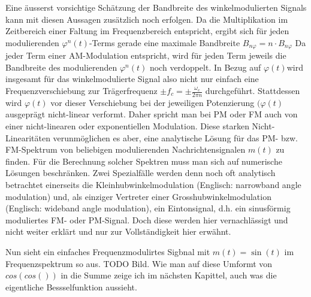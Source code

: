 Eine äusserst vorsichtige Schätzung der Bandbreite des winkelmodulierten Signals kann mit diesen Aussagen zusätzlich noch erfolgen.
Da die Multiplikation im Zeitbereich einer Faltung im Frequenzbereich entspricht, ergibt sich für jeden modulierenden \(\varphi^n (t)\)-Terms gerade 
eine maximale Bandbreite \(B_{n\varphi} = n \cdot B_{n\varphi}\)
Da jeder Term einer AM-Modulation entspricht, wird für jeden Term jeweils die Bandbreite des modulierenden \(\varphi^n (t)\) noch verdoppelt.
In Bezug auf \(\varphi(t)\)wird insgesamt für das winkelmodulierte Signal also nicht nur einfach eine 
Frequenzverschiebung zur Trägerfrequenz \(\pm f_c = \pm \frac{\omega_c}{2\pi n}\) durchgeführt.
Stattdessen wird \(\varphi(t)\) vor dieser Verschiebung bei der jeweiligen Potenzierung \((\varphi(t)\) ausgeprägt nicht-linear verformt.
Daher spricht man bei PM oder FM auch von einer nicht-linearen oder exponentiellen Modulation.
Diese starken Nicht-Linearitäten verunmöglichen es aber, eine analytische Lösung für das PM- bzw. FM-Spektrum von beliebigen modulierenden Nachrichtensignalen \(m(t)\) zu finden.
Für die Berechnung solcher Spektren muss man sich auf numerische Lösungen beschränken.
Zwei Spezialfälle werden denn noch oft analytisch betrachtet einerseits die Kleinhubwinkelmodulation (Englisch: narrowband angle modulation) und, als
einziger Vertreter einer Grosshubwinkelmodulation (Englisch: wideband angle modulation), ein Eintonsignal, d.h. ein sinusförmig moduliertes FM- oder PM-Signal.
Doch diese werden hier vernachlässigt und nicht weiter erklärt und nur zur Vollständigkeit hier erwähnt.

Nun sieht ein einfaches Frequenzmodulirtes Sigbnal mit \(m(t) = \sin(t)\) im Frequenzspektrum so aus.
TODO Bild.
Wie man auf diese Umformt von \(cos (cos())\) in die Summe zeige ich im nächsten Kapittel, auch was die eigentliche Bessselfunktion aussieht.

